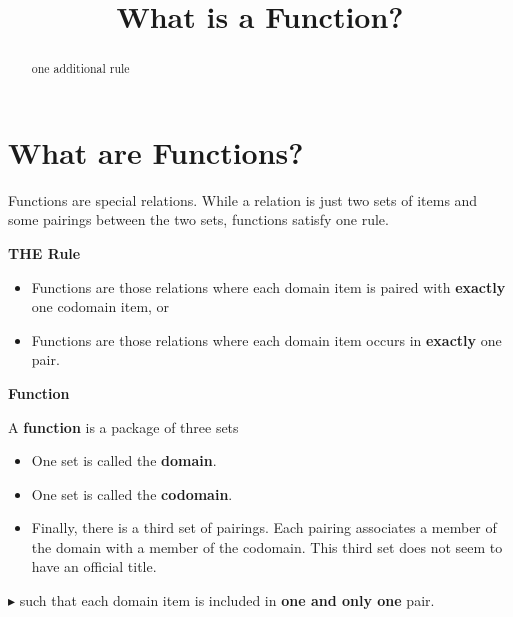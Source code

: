 \documentclass{ximera}
\title{What is a Function?}
\begin{document}
\begin{abstract}
one additional rule
\end{abstract}
\maketitle




\section*{What are Functions?}

Functions are special relations. While a relation is just two sets of items and some pairings between the two sets, functions satisfy one rule. 


\begin{condition} \textbf{\textcolor{purple!85!blue}{THE Rule}} 

\begin{itemize}
\item Functions are those relations where each domain item is paired with \textbf{\textcolor{red!80!black}{exactly}} one codomain item, or
\item Functions are those relations where each domain item occurs in \textbf{\textcolor{red!80!black}{exactly}} one pair.
\end{itemize}
\end{condition}






\begin{definition} \textbf{\textcolor{green!50!black}{Function}}

A \textbf{function} is a package of three sets

\begin{itemize}
\item One set is called the \textbf{\textcolor{purple!85!blue}{domain}}. 
\item One set is called the \textbf{\textcolor{purple!85!blue}{codomain}}.  
\item Finally, there is a third set of pairings.  Each pairing associates a member of the domain with a member of the codomain. This third set does not seem to have an official title.
\end{itemize}

\textbf{\textcolor{red!90!darkgray}{$\blacktriangleright$}} such that each domain item is included in \textbf{\textcolor{red!80!black}{one and only one}} pair.

\end{definition}
\end{document}
